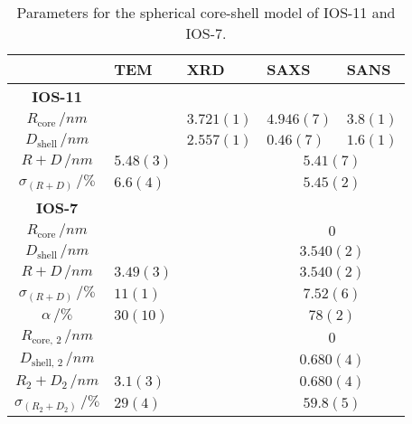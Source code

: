 \documentclass[\main/dresen_thesis.tex]{subfiles}
\begin{document}
    \begin{table}[!htbp]
      \centering
      \caption{\label{tab:looselyPackedNP:nanoparticle:comparisonSASXRDTEM}Parameters for the spherical core-shell model of IOS-11 and IOS-7.}
      \begin{tabular}{ c | l | l | l | l}
        \rule{0pt}{2ex} & \textbf{TEM} & \textbf{XRD} & \textbf{SAXS} & \textbf{SANS} \\
        \hline
        \rule{0pt}{2ex} \textbf{IOS-11}\\
        \hline
        \rule{0pt}{2ex} $R_\mathrm{core} \, / \unit{nm}$            &               & $3.721(1)$  & $4.946(7)$ & $3.8(1)$\\
        \rule{0pt}{2ex} $D_\mathrm{shell}\, / \unit{nm}$            &               & $2.557(1)$  & $0.46(7)$  & $1.6(1)$ \\
        \rule{0pt}{2ex} $R+D             \, / \unit{nm}$            & $5.48(3)$     &             & \multicolumn{2}{c}{$5.41(7)$}\\
        \rule{0pt}{2ex} $\sigma_{(R+D)}  \, / \unit{\%}$            & $6.6(4)$      &             & \multicolumn{2}{c}{$5.45(2)$}\\
        \hline
        \rule{0pt}{2ex} \textbf{IOS-7}\\
        \hline
        \rule{0pt}{2ex} $R_\mathrm{core} \, / \unit{nm}$            &               &             & \multicolumn{2}{c}{$0$}\\
        \rule{0pt}{2ex} $D_\mathrm{shell}\, / \unit{nm}$            &               &             & \multicolumn{2}{c}{$3.540(2)$}\\
        \rule{0pt}{2ex} $R+D             \, / \unit{nm}$            & $3.49(3)$     &             & \multicolumn{2}{c}{$3.540(2)$}\\
        \rule{0pt}{2ex} $\sigma_{(R+D)}  \, / \unit{\%}$            & $11(1)$       &             & \multicolumn{2}{c}{$7.52(6)$}\\
        \rule{0pt}{2ex} $\alpha \, / \unit{\%}$                     & $30(10)$      &             & \multicolumn{2}{c}{$78(2)$}\\
        \rule{0pt}{2ex} $R_{\mathrm{core},\, 2} \, / \unit{nm}$     &               &             & \multicolumn{2}{c}{$0$}\\
        \rule{0pt}{2ex} $D_{\mathrm{shell}, \, 2}\, / \unit{nm}$    &               &             & \multicolumn{2}{c}{$0.680(4)$}\\
        \rule{0pt}{2ex} $R_2 + D_2       \, / \unit{nm}$            & $3.1(3)$      &             & \multicolumn{2}{c}{$0.680(4)$}\\
        \rule{0pt}{2ex} $\sigma_{(R_2 + D_2)}\, / \unit{\%}$        & $29(4)$       &             & \multicolumn{2}{c}{$59.8(5)$}\\
        \hline
      \end{tabular}
    \end{table}
\end{document}
